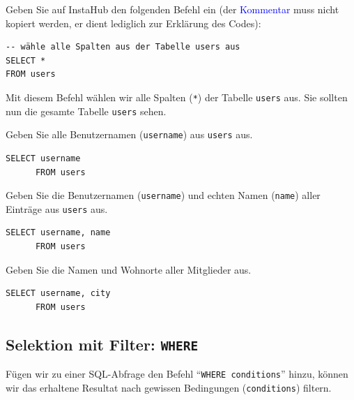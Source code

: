 \begin{myexample}
Geben Sie auf InstaHub den folgenden Befehl ein (der \textcolor{blue}{Kommentar} muss nicht kopiert werden, er dient lediglich zur Erklärung des Codes):

\begin{lstlisting}[style=sql]
-- wähle alle Spalten aus der Tabelle users aus
SELECT *
FROM users
\end{lstlisting}

Mit diesem Befehl wählen wir alle Spalten (\lstinline[style=sql]|*|) der Tabelle \lstinline[style=sql]|users| aus.
Sie sollten nun die gesamte Tabelle \texttt{users} sehen.
\end{myexample}

\begin{myexercise}
  Geben Sie alle Benutzernamen (\texttt{username}) aus \texttt{users} aus.
  \begin{myanswer}
    \begin{lstlisting}[style=sql]
      SELECT username
      FROM users
      \end{lstlisting}
  \end{myanswer}
\end{myexercise}

\begin{myexercise}
  Geben Sie die Benutzernamen (\texttt{username}) und echten Namen (\texttt{name}) aller Einträge aus \texttt{users} aus.
  \begin{myanswer}
    \begin{lstlisting}[style=sql]
      SELECT username, name
      FROM users
    \end{lstlisting}
  \end{myanswer}
\end{myexercise}

\begin{myexercise}
  Geben Sie die Namen und Wohnorte aller Mitglieder aus.
  \begin{myanswer}
    \begin{lstlisting}[style=sql]
      SELECT username, city
      FROM users
    \end{lstlisting}
  \end{myanswer}
\end{myexercise}

\subsection{Selektion mit Filter: \texorpdfstring{\lstinline[style=sql]|WHERE|}{WHERE}}
Fügen wir zu einer \gls{SQL}-Abfrage den Befehl ``\lstinline[style=sql]|WHERE conditions|'' hinzu, können wir das erhaltene Resultat nach gewissen Bedingungen (\texttt{conditions}) filtern.


